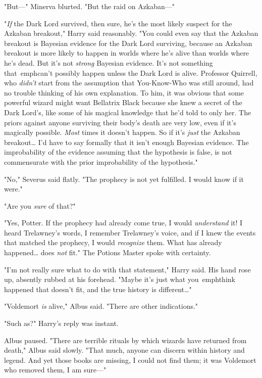 "But---" Minerva blurted. "But the raid on Azkaban---"

"\emph{If} the Dark Lord survived, then sure, he's the most likely suspect for 
the Azkaban breakout," Harry said reasonably. "You could even say that the 
Azkaban breakout is Bayesian evidence for the Dark Lord surviving, because an 
Azkaban breakout is more likely to happen in worlds where he's alive than 
worlds where he's dead. But it's not \emph{strong} Bayesian evidence. It's not 
something that\ emph{can't possibly happen} unless the Dark Lord is alive. 
Professor Quirrell, who \emph{didn't} start from the assumption that 
You-Know-Who was still around, had no trouble thinking of his own explanation. 
To him, it was obvious that some powerful wizard might want Bellatrix Black 
because she knew a secret of the Dark Lord's, like some of his magical 
knowledge that he'd told to only her. The priors against anyone surviving their 
body's death are very low, even if it's magically possible. \emph{Most} times 
it doesn't happen. So if it's \emph{just} the Azkaban breakout{\ldots} I'd have 
to say formally that it isn't enough Bayesian evidence. The improbability of 
the evidence assuming that the hypothesis is false, is not commensurate with 
the prior improbability of the hypothesis."

"No," Severus said flatly. "The prophecy is not yet fulfilled. I would know if 
it were."

"Are you \emph{sure} of that?"

"Yes, Potter. If the prophecy had already come true, I would \emph{understand} 
it! I heard Trelawney's words, I remember Trelawney's voice, and if I knew the 
events that matched the prophecy, I would \emph{recognize} them. What has 
already happened{\ldots} does \emph{not} fit." The Potions Master spoke with 
certainty.

"I'm not really sure what to do with that statement," Harry said. His hand rose 
up, absently rubbed at his forehead. "Maybe it's just what you\ emph{think} 
happened that doesn't fit, and the true history is different{\ldots}"

"Voldemort \emph{is} alive," Albus said. "There are other indications."

"Such as?" Harry's reply was instant.

Albus paused. "There are terrible rituals by which wizards have returned from 
death," Albus said slowly. "That much, anyone can discern within history and 
legend. And yet those books are missing, I could not find them; it was 
Voldemort who removed them, I am sure---"

